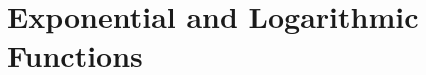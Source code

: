 



\chapter{Exponential and Logarithmic Functions} \label{chapter-exponential-and-logarithmic-functions}

\minitoc

\newpage

~ %

\iffalse

\setcounter{section}{-1}
\section{Learning Objectives}

By the end of Section 2.1, you should be able to:
\setlist{itemsep=0pt}
\begin{itemize}
	\item objective 1
	\item objective 2
	\item objective 3
	\item objective 4
\end{itemize}

By the end of Section 2.2, you should be able to:
\begin{itemize}
	\item objective 1
	\item objective 2
	\item objective 3
	\item objective 4
\end{itemize}





\setlist{itemsep=6pt}

\fi